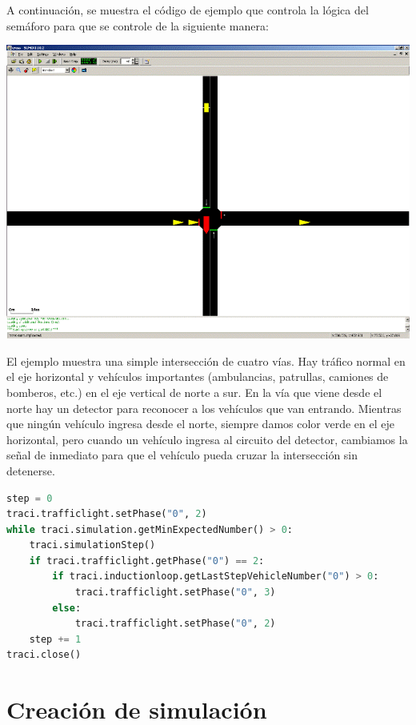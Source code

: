 A continuación, se muestra el código de ejemplo que controla la lógica
del semáforo para que se controle de la siguiente manera:

\includegraphics[width=\textwidth]{sumo/3a9d001be95c93c93c1c13ed9aeb7b26.png}

El ejemplo muestra una simple intersección de cuatro vías. Hay tráfico
normal en el eje horizontal y vehículos importantes (ambulancias,
patrullas, camiones de bomberos, etc.) en el eje vertical de norte a
sur. En la vía que viene desde el norte hay un detector para reconocer a
los vehículos que van entrando. Mientras que ningún vehículo ingresa
desde el norte, siempre damos color verde en el eje horizontal, pero
cuando un vehículo ingresa al circuito del detector, cambiamos la señal
de inmediato para que el vehículo pueda cruzar la intersección sin
detenerse.

\begin{lstlisting}[language=Python]
step = 0
traci.trafficlight.setPhase("0", 2)
while traci.simulation.getMinExpectedNumber() > 0:
    traci.simulationStep()
    if traci.trafficlight.getPhase("0") == 2:
        if traci.inductionloop.getLastStepVehicleNumber("0") > 0:
            traci.trafficlight.setPhase("0", 3)
        else:
            traci.trafficlight.setPhase("0", 2)
    step += 1
traci.close()
\end{lstlisting}

\hypertarget{creaciuxf3n-de-simulaciuxf3n}{%
\section{Creación de simulación}\label{creaciuxf3n-de-simulaciuxf3n}}

